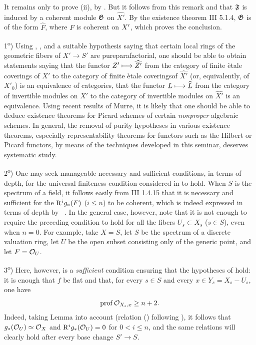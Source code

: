 It remains only to prove (ii), by . But it follows from this remark and  that $\formelF$ is induced by a coherent module $\formelG$ on $\widehat{X'}$. By the existence theorem \EGA III 5.1.4, $\formelG$ is of the form $\widehat{F}$, where $F$ is coherent on $\sisi{X}{X'}$, which proves the conclusion.

\begin{remarques} \label{XII.5.11}
1\textsuperscript{o}) Using , , and a suitable hypothesis saying that certain local rings of the geometric fibers of $X'\to S'$ are \og pure\fg \resp parafactorial, one should be able to obtain statements saying that the functor $Z'\mto\widehat{Z'}$ from the category of finite \`etale coverings of $X'$ to the category of finite \`etale coverings\pageoriginale of $\widehat{X'}$ (or, equivalently, of $X'_0$) is an equivalence of categories, \resp that the functor $L\mto\widehat{L}$ from the category of invertible modules on $X'$ to the category of invertible modules on $\widehat{X'}$ is an equivalence. Using recent results of Murre, it is likely that one should be able to deduce existence theorems for Picard schemes of certain \emph{nonproper} algebraic schemes. In general, the removal of purity hypotheses in various existence theorems, especially representability theorems for functors such as the Hilbert or Picard functors, by means of the techniques developed in this seminar, deserves systematic study.

2\textsuperscript{o}) One may seek manageable necessary and sufficient conditions, in terms of depth, for the universal finiteness condition considered in  to hold. When $S$ is the spectrum of a field, it follows easily from \EGA III 1.4.15 that it is necessary and sufficient for the $\R^ig_\ast(F)$ ($i\leq n$) to be coherent, which is indeed expressed in terms of depth by ~. In the general case, however, note that it is not enough to require the preceding condition to hold for all the fibers $U_s\subset X_s$ ($s\in S$), even when $n=0$. For example, take $X=S$, let $S$ be the spectrum of a discrete valuation ring, let $U$ be the open subset consisting only of the generic point, and let $F=\Oo_U$.

3\textsuperscript{o}) Here, however, is a \emph{sufficient} condition ensuring that the hypotheses of  hold: it is enough that $f$ be flat and that, for every $s\in S$ and every $x\in Y_s=X_s-U_s$, one have
\[
\prof \Oo_{X_s,x}\geq n+2.
\]
Indeed, taking Lemma  into account (\cf relation () following ), it follows that $g_*(\Oo_U)\simeq\OX$ and $\R^ig_*(\Oo_U)=0$ for $0<i\leq n$, and the same relations will clearly hold after every base change $S'\to S$.
\end{remarques}
